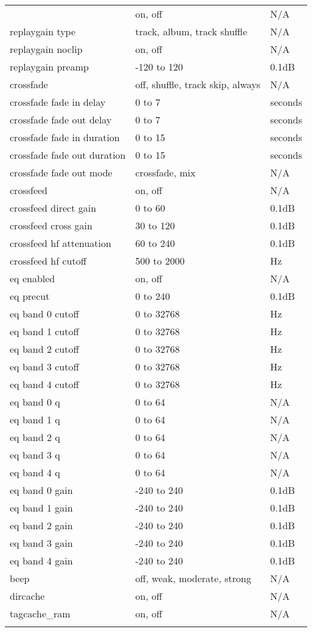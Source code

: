 \begin{center}
\begin{longtable}{@{}lll@{}}
    \opt{SWCODEC}{
      replaygain & on, off & N/A\\
      replaygain type & track, album, track shuffle & N/A\\
      replaygain noclip & on, off & N/A\\
      replaygain preamp & -120 to 120 & 0.1dB\\
%
      crossfade & off, shuffle, track skip, always & N/A\\
      crossfade fade in delay & 0 to 7 & seconds\\
      crossfade fade out delay & 0 to 7 & seconds\\
      crossfade fade in duration & 0 to 15 & seconds\\
      crossfade fade out duration & 0 to 15 & seconds\\
      crossfade fade out mode & crossfade, mix & N/A\\
%
      crossfeed & on, off & N/A\\
      crossfeed direct gain & 0 to 60 & 0.1dB\\
      crossfeed cross gain & 30 to 120 & 0.1dB\\
      crossfeed hf attenuation & 60 to 240 & 0.1dB\\
      crossfeed hf cutoff & 500 to 2000 & Hz\\
%
      eq enabled & on, off & N/A\\
      eq precut& 0 to 240 & 0.1dB\\
      eq band 0 cutoff & 0 to 32768 & Hz\\
      eq band 1 cutoff & 0 to 32768 & Hz\\
      eq band 2 cutoff & 0 to 32768 & Hz\\
      eq band 3 cutoff & 0 to 32768 & Hz\\
      eq band 4 cutoff & 0 to 32768 & Hz\\
      eq band 0 q & 0 to 64 & N/A\\
      eq band 1 q & 0 to 64 & N/A\\
      eq band 2 q & 0 to 64 & N/A\\
      eq band 3 q & 0 to 64 & N/A\\
      eq band 4 q & 0 to 64 & N/A\\
      eq band 0 gain & -240 to 240 & 0.1dB\\
      eq band 1 gain & -240 to 240 & 0.1dB\\
      eq band 2 gain & -240 to 240 & 0.1dB\\
      eq band 3 gain & -240 to 240 & 0.1dB\\
      eq band 4 gain & -240 to 240 & 0.1dB\\
%
      beep & off, weak, moderate, strong & N/A\\
      dircache & on, off & N/A\\
      tagcache\_ram & on, off & N/A\\
    }


\end{longtable}
\end{center}
